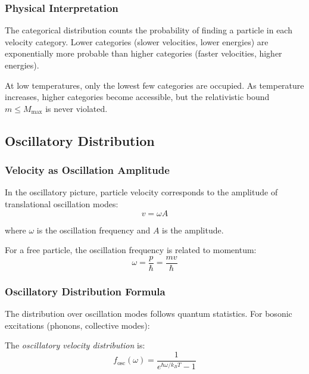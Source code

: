 \subsubsection{Physical Interpretation}

The categorical distribution counts the probability of finding a particle in each velocity category. Lower categories (slower velocities, lower energies) are exponentially more probable than higher categories (faster velocities, higher energies).

At low temperatures, only the lowest few categories are occupied. As temperature increases, higher categories become accessible, but the relativistic bound $m \leq M_{\max}$ is never violated.

\subsection{Oscillatory Distribution}

\subsubsection{Velocity as Oscillation Amplitude}

In the oscillatory picture, particle velocity corresponds to the amplitude of translational oscillation modes:
\begin{equation}
v = \omega A
\end{equation}

where $\omega$ is the oscillation frequency and $A$ is the amplitude.

For a free particle, the oscillation frequency is related to momentum:
\begin{equation}
\omega = \frac{p}{\hbar} = \frac{mv}{\hbar}
\end{equation}

\subsubsection{Oscillatory Distribution Formula}

The distribution over oscillation modes follows quantum statistics. For bosonic excitations (phonons, collective modes):

\begin{definition}
The \textit{oscillatory velocity distribution} is:
\begin{equation}
\boxed{f_{\text{osc}}(\omega) = \frac{1}{e^{\hbar\omega/k_B T} - 1}}
\label{eq:oscillatory_distribution}
\end{equation}
\end{definition}


